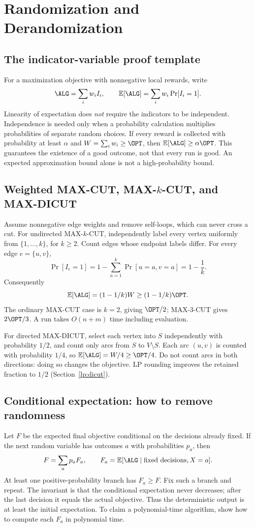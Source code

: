 \section{Randomization and Derandomization}\label{ra:main}

\subsection{The indicator-variable proof template}
For a maximization objective with nonnegative local rewards, write
\[
  \ALG=\sum_i w_i I_i,\qquad
  \mathbb E[\ALG]=\sum_i w_i\Pr[I_i=1].
\]
Linearity of expectation does \emph{not} require the indicators to be
independent. Independence is needed only when a probability calculation
multiplies probabilities of separate random choices. If every reward is
collected with probability at least $\alpha$ and
$W=\sum_iw_i\ge\OPT$, then $\mathbb E[\ALG]\ge\alpha\OPT$.
This guarantees the existence of a good outcome, not that every run is good.
An expected approximation bound alone is not a high-probability bound.

\subsection{Weighted MAX-CUT, MAX-\texorpdfstring{$k$}{k}-CUT, and MAX-DICUT}
Assume nonnegative edge weights and remove self-loops, which can never cross
a cut. For undirected MAX-$k$-CUT, independently label every vertex uniformly
from $\{1,\ldots,k\}$, for $k\ge2$. Count edges whose endpoint labels differ.
For every edge $e=\{u,v\}$,
\[
  \Pr[I_e=1]=1-\sum_{a=1}^k\Pr[u=a,v=a]=1-\frac1k.
\]
Consequently
\[
  \mathbb E[\ALG]=(1-1/k)W\ge(1-1/k)\OPT.
\]
The ordinary MAX-CUT case is $k=2$, giving $\OPT/2$; MAX-3-CUT gives
$2\OPT/3$. A run takes $O(n+m)$ time including evaluation.

For directed MAX-DICUT, select each vertex into $S$ independently with
probability $1/2$, and count only arcs from $S$ to $V\setminus S$.
Each arc $(u,v)$ is counted with probability $1/4$, so
$\mathbb E[\ALG]=W/4\ge\OPT/4$.
Do not count arcs in both directions: doing so changes the objective.
LP rounding improves the retained fraction to $1/2$
(Section~\ref{lp:dicut}).

\subsection{Conditional expectation: how to remove randomness}\label{ra:conditional}
Let $F$ be the expected final objective conditional on the decisions already
fixed. If the next random variable has outcomes $a$ with probabilities $p_a$,
then
\[
  F=\sum_a p_a F_a,\qquad
  F_a=\mathbb E[\ALG\mid\text{fixed decisions},X=a].
\]
At least one positive-probability branch has $F_a\ge F$. Fix such a branch and
repeat. The invariant is that the conditional expectation never decreases;
after the last decision it equals the actual objective. Thus the deterministic
output is at least the initial expectation. To claim a polynomial-time
algorithm, show how to compute each $F_a$ in polynomial time.

